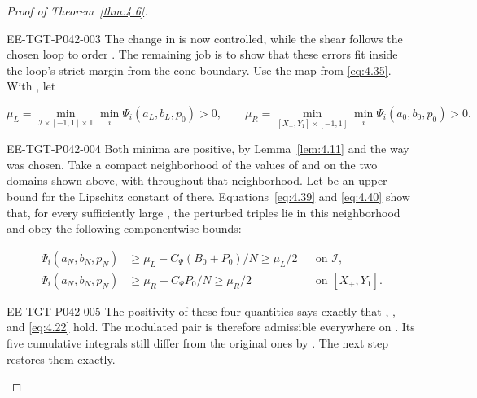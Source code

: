 \begin{proof}[Proof of Theorem~\ref{thm:4.6}]
\begin{EESegment}{EE-TGT-P042-003}
The change in  is now controlled, while the shear follows the chosen loop
to order . The remaining job is to show that these errors
fit inside the loop's strict margin from the cone boundary. Use the map
 from \eqref{eq:4.35}. With
, let
\end{EESegment}
\[
\mu_L=\min_{\mathcal I\times[-1,1]\times\mathbb T}\min_i
\Psi_i(a_L,b_L,p_0)>0,
\qquad
\mu_R=\min_{[X_+,Y_1]\times[-1,1]}\min_i
\Psi_i(a_0,b_0,p_0)>0.
\]
\begin{EESegment}{EE-TGT-P042-004}
Both minima are positive, by Lemma~\ref{lem:4.11} and the way
 was chosen. Take a compact neighborhood of the values of
 and  on the two domains
shown above, with  throughout that neighborhood. Let
 be an upper bound for the Lipschitz constant of
 there. Equations~\eqref{eq:4.39} and \eqref{eq:4.40} show that, for every
sufficiently large , the perturbed triples lie in this neighborhood and obey
the following componentwise bounds:
\end{EESegment}
\begin{equation}
\begin{aligned}
\Psi_i(a_N,b_N,p_N)&\ge\mu_L-C_\Psi(B_0+P_0)/N\ge\mu_L/2
&&\text{on }\mathcal I,\\
\Psi_i(a_N,b_N,p_N)&\ge\mu_R-C_\Psi P_0/N\ge\mu_R/2
&&\text{on }[X_+,Y_1].
\end{aligned}
\tag{4.41}\label{eq:4.41}
\end{equation}
\begin{EESegment}{EE-TGT-P042-005}
The positivity of these four quantities says exactly that
, , and \eqref{eq:4.22} hold. The
modulated pair is therefore admissible everywhere on
. Its five cumulative integrals still differ from the original
ones by . The next step restores them exactly.
\end{EESegment}


\end{proof}
